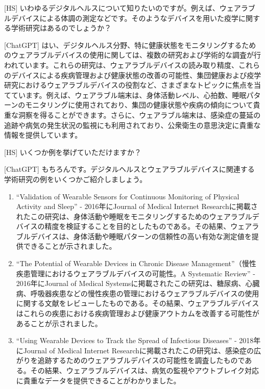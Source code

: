 \documentclass[
]{bxjsbook}
\providecommand{\tightlist}{%
  \setlength{\itemsep}{0pt}\setlength{\parskip}{0pt}}
\theoremstyle{definition}
\theoremstyle{definition}
\theoremstyle{definition}
\theoremstyle{definition}
\theoremstyle{remark}
\begin{document}
{[}HS{]} いわゆるデジタルヘルスについて知りたいのですが。例えば、ウェアラブルデバイスによる体調の測定などです。そのようなデバイスを用いた疫学に関する学術研究はあるのでしょうか？

{[}ChatGPT{]} はい、デジタルヘルス分野、特に健康状態をモニタリングするためのウェアラブルデバイスの使用に関しては、複数の研究および学術的な調査が行われています。これらの研究は、ウェアラブルデバイスの読み取り精度、これらのデバイスによる疾病管理および健康状態の改善の可能性、集団健康および疫学研究におけるウェアラブルデバイスの役割など、さまざまなトピックに焦点を当てています。例えば、ウェアラブル端末は、身体活動レベル、心拍数、睡眠パターンのモニタリングに使用されており、集団の健康状態や疾病の傾向について貴重な洞察を得ることができます。さらに、ウェアラブル端末は、感染症の蔓延の追跡や病気の発生状況の監視にも利用されており、公衆衛生の意思決定に貴重な情報を提供しています。

{[}HS{]} いくつか例を挙げていただけますか？

{[}ChatGPT{]} もちろんです。デジタルヘルスとウェアラブルデバイスに関連する学術研究の例をいくつかご紹介しましょう。

\begin{enumerate}
\def\labelenumi{\arabic{enumi}.}
\tightlist
\item
  ``Validation of Wearable Sensors for Continuous Monitoring of Physical Activity and Sleep'' - 2016年にJournal of Medical Internet Researchに掲載されたこの研究は、身体活動や睡眠をモニタリングするためのウェアラブルデバイスの精度を検証することを目的としたものである。その結果、ウェアラブルデバイスは、身体活動や睡眠パターンの信頼性の高い有効な測定値を提供できることが示されました。
\item
  ``The Potential of Wearable Devices in Chronic Disease Management''（慢性疾患管理におけるウェアラブルデバイスの可能性。A Systematic Review'' - 2016年にJournal of Medical Systemsに掲載されたこの研究は、糖尿病、心臓病、呼吸器疾患などの慢性疾患の管理におけるウェアラブルデバイスの使用に関する文献をレビューしたものである。その結果、ウェアラブルデバイスはこれらの疾患における疾病管理および健康アウトカムを改善する可能性があることが示されました。
\item
  ``Using Wearable Devices to Track the Spread of Infectious Diseases'' - 2018年にJournal of Medical Internet Researchに掲載されたこの研究は、感染症の広がりを追跡するためのウェアラブルデバイスの可能性を調査したものである。その結果、ウェアラブルデバイスは、病気の監視やアウトブレイク対応に貴重なデータを提供できることがわかりました。
\end{enumerate}
\end{document}
